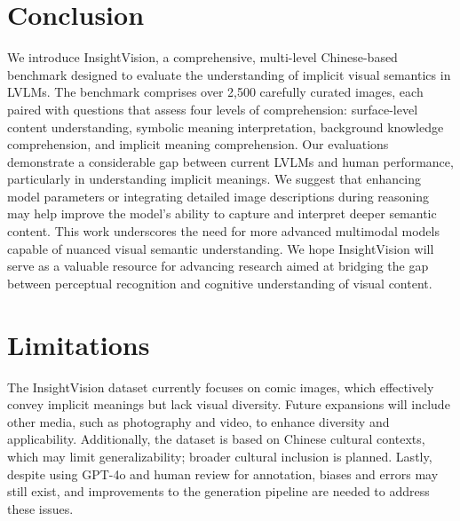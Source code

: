 \section{Conclusion}
\label{sec:Conclusion}
We introduce InsightVision, a comprehensive, multi-level Chinese-based benchmark designed to evaluate the understanding of implicit visual semantics in LVLMs. The benchmark comprises over 2,500 carefully curated images, each paired with questions that assess four levels of comprehension: surface-level content understanding, symbolic meaning interpretation, background knowledge comprehension, and implicit meaning comprehension. Our evaluations demonstrate a considerable gap between current LVLMs and human performance, particularly in understanding implicit meanings. We suggest that enhancing model parameters or integrating detailed image descriptions during reasoning may help improve the model's ability to capture and interpret deeper semantic content. This work underscores the need for more advanced multimodal models capable of nuanced visual semantic understanding. We hope InsightVision will serve as a valuable resource for advancing research aimed at bridging the gap between perceptual recognition and cognitive understanding of visual content.

\section*{Limitations}
The InsightVision dataset currently focuses on comic images, which effectively convey implicit meanings but lack visual diversity. Future expansions will include other media, such as photography and video, to enhance diversity and applicability. Additionally, the dataset is based on Chinese cultural contexts, which may limit generalizability; broader cultural inclusion is planned. Lastly, despite using GPT-4o and human review for annotation, biases and errors may still exist, and improvements to the generation pipeline are needed to address these issues.


